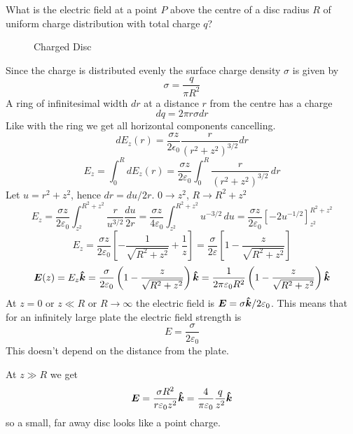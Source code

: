 \documentclass{article}
\begin{document}
    \example
    What is the electric field at a point \(P\) above the centre of a disc radius \(R\) of uniform charge distribution with total charge \(q\)?
    \begin{figure}[ht]
        \centering
        \caption{Charged Disc}
    \end{figure}
    Since the charge is distributed evenly the surface charge density \(\sigma\) is given by
    \[\sigma = \frac{q}{\pi R^2}\]
    A ring of infinitesimal width \(dr\) at a distance \(r\) from the centre has a charge
    \[dq = 2\pi r\sigma dr\]
    Like with the ring we get all horizontal components cancelling.
    \[dE_z(r) = \frac{\sigma z}{2\epsilon_0}\frac{r}{\left(r^2 + z^2\right)^{3/2}}dr\]
    \[E_z = \int_0^R dE_z(r) = \frac{\sigma z}{2\varepsilon_0}\int_0^R\frac{r}{\left(r^2 + z^2\right)^{3/2}}\,dr\]
    Let \(u = r^2 + z^2\), hence \(dr = du/2r\). \(0\to z^2\), \(R\to R^2 + z^2\)
    \[E_z = \frac{\sigma z}{2\varepsilon_0}\int_{z^2}^{R^2 + z^2}\frac{r}{u^{3/2}}\frac{du}{2r} = \frac{\sigma z}{4\varepsilon_0}\int_{z^2}^{R^2 + z^2}u^{-3/2}\,du = \frac{\sigma z}{2\varepsilon_0}\left[-2u^{-1/2}\right]_{z^2}^{R^2 + z^2}\]
    \[E_z = \frac{\sigma z}{2\varepsilon_0}\left[-\frac{1}{\sqrt{R^2 + z^2}} + \frac{1}{z}\right] = \frac{\sigma}{2\varepsilon}\left[1 - \frac{z}{\sqrt{R^2 + z^2}}\right]\]
    \[\bm{E}(z) = E_z\bm{\hat{k}} = \frac{\sigma}{2\varepsilon_0}\left(1 - \frac{z}{\sqrt{R^2 + z^2}}\right)\bm{\hat{k}} = \frac{1}{2\pi\varepsilon_0R^2}\left(1 - \frac{z}{\sqrt{R^2 + z^2}}\right)\bm{\hat{k}}\]
    At \(z = 0\) or \(z \ll R\) or \(R\to\infty\) the electric field is \(\bm{E} = \sigma\bm{\hat{k}}/2\varepsilon_0\).
    This means that for an infinitely large plate the electric field strength is
    \[E = \frac{\sigma}{2\varepsilon_0}\]
    This doesn't depend on the distance from the plate.
    
    At \(z\gg R\) we get
    \[\bm{E} = \frac{\sigma R^2}{r\varepsilon_0z^2}\bm{\hat{k}} = \frac{4}{\pi\varepsilon_0}\frac{q}{z^2}\bm{\hat{k}}\]
    so a small, far away disc looks like a point charge.
    
\end{document}

